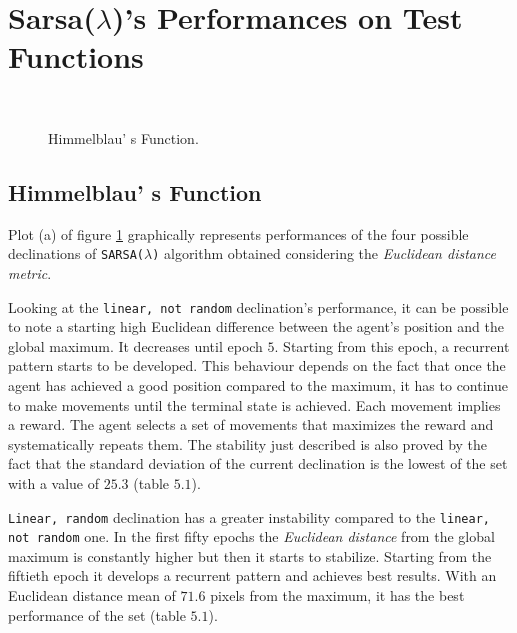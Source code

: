 \section{Sarsa($\lambda$)'s Performances on Test Functions}

\begin{figure}[h!]
	\begin{center}
		\\
	\end{center}
	\caption{
		Himmelblau' s Function.
	}
	\label{fig:HimmelblauResults}
\end{figure}

\subsection{Himmelblau' s Function} Plot (a) of figure \ref{fig:HimmelblauResults} graphically represents performances of the four possible declinations of {\tt SARSA($\lambda$)} algorithm obtained considering the \textit{Euclidean distance metric}. 

Looking at the {\tt linear, not random} declination's performance, it can be possible to note a starting high Euclidean difference between the agent's position and the global maximum. It decreases until epoch $5$. Starting from this epoch, a recurrent pattern starts to be developed. This behaviour depends on the fact that once the agent has achieved a good position compared to the maximum, it has to continue to make movements until the terminal state is achieved. Each movement implies a reward. The agent selects a set of movements that maximizes the reward and systematically repeats them. The stability just described is also proved by the fact that the standard deviation of the current declination is the lowest of the set with a value of $25.3$ (table $5.1$).

{\tt Linear, random} declination has a greater instability compared to the {\tt linear, not random} one. In the first fifty epochs the \textit{Euclidean distance} from the global maximum is constantly higher but then it starts to stabilize. Starting from the fiftieth epoch it develops a recurrent pattern and achieves best results. With an Euclidean distance mean of $71.6$ pixels from the maximum, it has the best performance of the set (table $5.1$).

